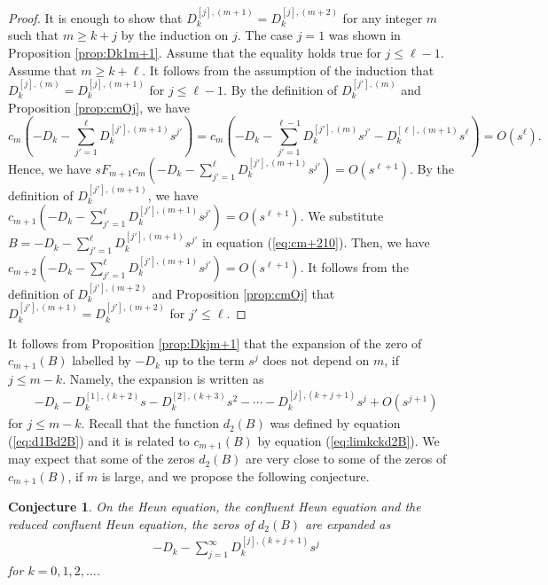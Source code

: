 \documentclass[12pt]{amsart}
\numberwithin{equation}{section}
\newtheorem{conj}{\bf Conjecture}
\theoremstyle{definition}
\theoremstyle{remark}
\begin{document}
\begin{proof}
It is enough to show that  $D_k^{[j],(m+1)} = D_k^{[j],(m+2)}  $ for any integer $m$ such that $m  \geq k + j  $ by the induction on $j$.
The case $j=1$ was shown in Proposition \ref{prop:Dk1m+1}.
Assume that the equality holds true for $j \leq \ell -1$.
Assume that $m  \geq k + \ell $.
It follows from the assumption of the induction that $D_k^{[j],(m)} = D_k^{[j],(m+1)}  $ for  $j \leq \ell -1$.
By the definition of $D_k^{[j'],(m)} $ and Proposition \ref{prop:cmOj}, we have 
\begin{equation}
 c_{m} ( -D_k -  \sum _{j'=1}^{\ell  } D_k^{[j'],(m+1)} s^{j'} ) = c_{m} ( -D_k -  \sum _{j'=1}^{\ell  -1} D_k^{[j'],(m)} s^{j'} - D_k^{[\ell ],(m+1)} s^{\ell }  ) = O(s^{\ell} ) .
\end{equation}
Hence, we have $s F_{m+1} c_{m} ( -D_k -  \sum _{j'=1}^{\ell  } D_k^{[j'],(m+1)} s^{j'} ) = O(s^{\ell +1} )$.
By the definition of $D_k^{[j'],(m+1)} $, we have $ c_{m+1} (-D_k -  \sum _{j'=1}^{\ell  } D_k^{[j'],(m+1)} s^{j'} ) = O(s^{\ell +1} ) $.
We substitute $B= -D_k - \sum _{j'=1}^{\ell  } D_k^{[j'],(m+1)} s^{j'}  $ in equation (\ref{eq:cm+210}).
Then, we have $ c_{m+2} (-D_k -  \sum _{j'=1}^{\ell  } D_k^{[j'],(m+1)} s^{j'} ) = O(s^{\ell +1} ) $.
It follows from the definition of $D_k^{[j'],(m+2)} $ and Proposition \ref{prop:cmOj} that $D_k^{[j'],(m+1)}  = D_k^{[j'],(m+2)}  $ for $j' \leq \ell $.
\end{proof}
It follows from Proposition \ref{prop:Dkjm+1} that the expansion of the zero of $c_{m+1} (B) $ labelled by $-D_k $ up to the term $s^j$ does not depend on $m$, if $j \leq m-k $.
Namely, the expansion is written as
\begin{align}
& -D_k - D_k^{[1],(k+2)} s - D_k^{[2],(k+3)} s^2 - \cdots - D_k^{[j],(k+j+1)} s^{j}  +O(s^{j+1})  
\end{align}
for $j \leq m-k$.
Recall that the function $d_2(B)$ was defined by equation (\ref{eq:d1Bd2B}) and it is related to $c_{m+1} (B) $ by equation (\ref{eq:limkckd2B}).
We may expect that some of the zeros $d_2(B)$ are very close to some of the zeros of $c_{m+1} (B) $, if $m$ is large, and we propose the following conjecture.
\begin{conj}
On the Heun equation, the confluent Heun equation and the reduced confluent Heun equation, the zeros of $d_2(B)$ are expanded as 
\begin{align}
&  -D_k - \sum _{j=1}^{\infty } D_k^{[j],(k+j+1)} s^{j} 
\end{align}
for $k=0,1,2,\dots $.
\end{conj}
\end{document}

